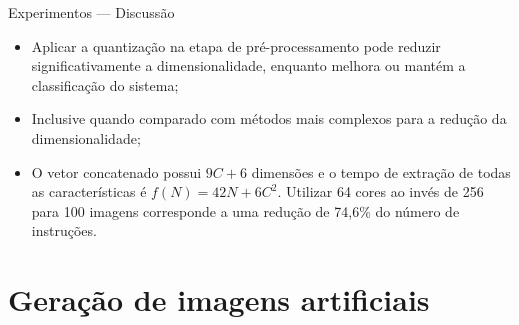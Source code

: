 \documentclass{beamer}
\begin{document}
\begin{frame}{Experimentos --- Discussão}
  \setlength\leftmargini{1em}
  \begin{block}{}
    \justifying
    \begin{itemize}
      \item Aplicar a quantização na etapa de pré-processamento pode reduzir significativamente a dimensionalidade, enquanto melhora ou mantém a classificação do sistema;
      \item Inclusive quando comparado com métodos mais complexos para a redução da dimensionalidade;
      \item O vetor concatenado possui $9C + 6$ dimensões e o tempo de extração de todas as características é $f(N)=42N+6C^2$. Utilizar 64 cores ao invés de 256 para 100 imagens corresponde a uma redução de 74,6\% do número de instruções.
    \end{itemize}
  \end{block}
\end{frame}
\section{Geração de imagens artificiais}
\end{document}
